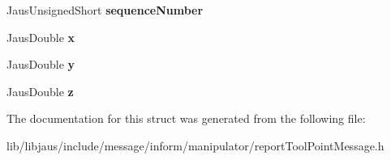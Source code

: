 \begin{DoxyCompactItemize}
\item 
\hypertarget{struct_report_tool_point_message_struct_a31e33b94e80913e8d92953997511ce37}{\-Jaus\-Unsigned\-Short {\bfseries sequence\-Number}}\label{struct_report_tool_point_message_struct_a31e33b94e80913e8d92953997511ce37}

\item 
\hypertarget{struct_report_tool_point_message_struct_a804d52d815e34235a669fff8ee0e5c25}{\-Jaus\-Double {\bfseries x}}\label{struct_report_tool_point_message_struct_a804d52d815e34235a669fff8ee0e5c25}

\item 
\hypertarget{struct_report_tool_point_message_struct_a9a4b07e42dd4c8552df4b7ddbd78d8d9}{\-Jaus\-Double {\bfseries y}}\label{struct_report_tool_point_message_struct_a9a4b07e42dd4c8552df4b7ddbd78d8d9}

\item 
\hypertarget{struct_report_tool_point_message_struct_ab409a9dc685adce4d52253d6e7225e44}{\-Jaus\-Double {\bfseries z}}\label{struct_report_tool_point_message_struct_ab409a9dc685adce4d52253d6e7225e44}

\end{DoxyCompactItemize}


\-The documentation for this struct was generated from the following file\-:\begin{DoxyCompactItemize}
\item 
lib/libjaus/include/message/inform/manipulator/report\-Tool\-Point\-Message.\-h\end{DoxyCompactItemize}
